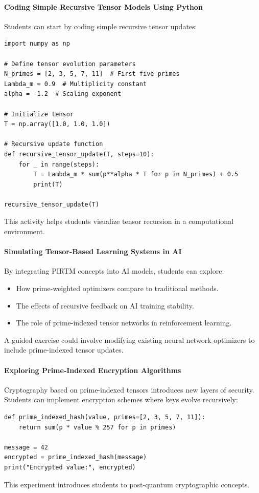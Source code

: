 \documentclass{article}
\theoremstyle{plain}
\begin{document}
\paragraph{Coding Simple Recursive Tensor Models Using Python}
Students can start by coding simple recursive tensor updates:
\begin{verbatim}
import numpy as np

# Define tensor evolution parameters
N_primes = [2, 3, 5, 7, 11]  # First five primes
Lambda_m = 0.9  # Multiplicity constant
alpha = -1.2  # Scaling exponent

# Initialize tensor
T = np.array([1.0, 1.0, 1.0])

# Recursive update function
def recursive_tensor_update(T, steps=10):
    for _ in range(steps):
        T = Lambda_m * sum(p**alpha * T for p in N_primes) + 0.5
        print(T)

recursive_tensor_update(T)
\end{verbatim}
This activity helps students visualize tensor recursion in a computational environment.

\paragraph{Simulating Tensor-Based Learning Systems in AI}
By integrating PIRTM concepts into AI models, students can explore:
\begin{itemize}
    \item How prime-weighted optimizers compare to traditional methods.
    \item The effects of recursive feedback on AI training stability.
    \item The role of prime-indexed tensor networks in reinforcement learning.
\end{itemize}
A guided exercise could involve modifying existing neural network optimizers to include prime-indexed tensor updates.

\paragraph{Exploring Prime-Indexed Encryption Algorithms}
Cryptography based on prime-indexed tensors introduces new layers of security. Students can implement encryption schemes where keys evolve recursively:
\begin{verbatim}
def prime_indexed_hash(value, primes=[2, 3, 5, 7, 11]):
    return sum(p * value % 257 for p in primes)

message = 42
encrypted = prime_indexed_hash(message)
print("Encrypted value:", encrypted)
\end{verbatim}
This experiment introduces students to post-quantum cryptographic concepts.
\end{document}

